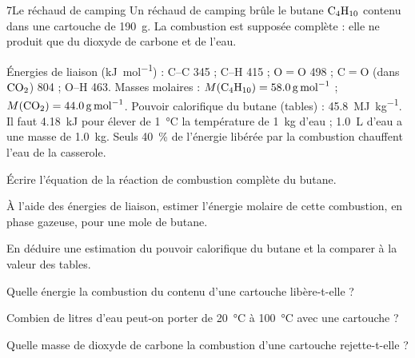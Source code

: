 \begin{exoBac}{7}{Le réchaud de camping}
Un réchaud de camping brûle le butane $\ce{C4H10}$ contenu dans une cartouche de \qty{190}{g}. La combustion est supposée complète : elle
ne produit que du dioxyde de carbone et de l'eau.
\begin{donnees}
Énergies de liaison (\unit{kJ.mol^{-1}}) : C--C 345 ; C--H 415 ; O$=$O 498 ; C$=$O (dans $\ce{CO2}$) 804 ; O--H 463. Masses molaires :
$M(\ce{C4H10})=\qty{58,0}{g.mol^{-1}}$ ; $M(\ce{CO2})=\qty{44,0}{g.mol^{-1}}$. Pouvoir calorifique du butane (tables) : \qty{45,8}{MJ.kg^{-1}}. Il faut
\qty{4,18}{kJ} pour élever de \qty{1}{\degreeCelsius} la température de \qty{1}{kg} d'eau ; \qty{1,0}{L} d'eau a une masse de \qty{1,0}{kg}. Seuls
\qty{40}{\percent} de l'énergie libérée par la combustion chauffent l'eau de la casserole.
\end{donnees}
\begin{questions}
\item Écrire l'équation de la réaction de combustion complète du butane.
\item À l'aide des énergies de liaison, estimer l'énergie molaire de cette combustion, en phase gazeuse, pour une mole de butane.
\item En déduire une estimation du pouvoir calorifique du butane et la comparer à la valeur des tables.
\item Quelle énergie la combustion du contenu d'une cartouche libère-t-elle ?
\item \initiative Combien de litres d'eau peut-on porter de \qty{20}{\degreeCelsius} à \qty{100}{\degreeCelsius} avec une cartouche ?
\item Quelle masse de dioxyde de carbone la combustion d'une cartouche rejette-t-elle ?
\end{questions}
\end{exoBac}

